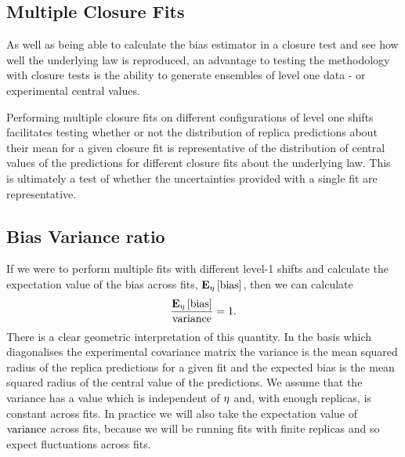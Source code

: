 \subsection{Multiple Closure Fits}

As well as being able to calculate the bias estimator in a closure test and see
how well the underlying law is reproduced, an advantage to testing the
methodology with closure tests is the ability to generate ensembles of level one
data - or experimental central values.

Performing multiple closure fits on
different configurations of level one shifts facilitates testing whether or not
the distribution of replica predictions about their mean for a given closure fit
is representative of the distribution of central values of the
predictions for different closure fits about the underlying law. This is ultimately
a test of whether the uncertainties provided with a single fit are
representative.

\subsection{Bias Variance ratio}

If we were to perform multiple fits with different level-1
shifts and calculate the expectation value of the bias across fits,
$\mathbf{E}_{\eta}\left[ {\rm bias} \right]$, then we can calculate
\begin{equation}
    \label{eq:BiasVarRatio}
    \frac{\mathbf{E}_{\eta}\left[ {\rm bias} \right]}{{\rm variance}} = 1.
\end{equation}
There is a clear geometric interpretation of this quantity.
In the basis which diagonalises the experimental
covariance matrix the variance is the mean squared radius of the replica predictions for a
given fit and the expected bias is the mean squared radius of the central value
of the predictions. We assume that the variance has a value which is
independent of $\eta$ and, with enough replicas, is constant across fits.
In practice we will also take the expectation value of ${\rm variance}$ across fits,
because we will be running fits with finite replicas and so expect fluctuations
across fits.

